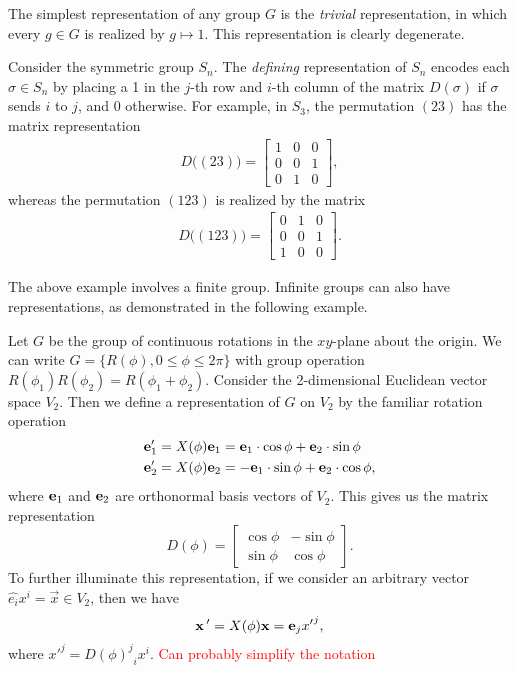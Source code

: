 \begin{example}
    The simplest representation of any group $G$ is the \textit{trivial} representation, in which every $g\in G$ is realized by $g\mapsto 1$. This representation is clearly degenerate.
\end{example}

\begin{example}
    Consider the symmetric group $S_n$. The \textit{defining} representation of $S_n$ encodes each $\sigma\in S_n$ by placing a 1 in the $j$-th row and $i$-th column of the matrix $D(\sigma)$ if $\sigma$ sends $i$ to $j$, and 0 otherwise. For example, in $S_3$, the permutation $(23)$ has the matrix representation
    \begin{align*}
        D\big((23)\big) = \begin{bmatrix} 1 & 0 & 0 \\ 0 & 0 & 1 \\ 0 & 1 & 0 \end{bmatrix},
    \end{align*}
    whereas the permutation $(123)$ is realized by the matrix
    \begin{align*}
        D\big((123)\big) = \begin{bmatrix} 0 & 1 & 0 \\ 0 & 0 & 1 \\ 1 & 0 & 0 \end{bmatrix}.
    \end{align*}
\end{example}

The above example involves a finite group. Infinite groups can also have representations, as demonstrated in the following example.
\begin{example}
    Let $G$ be the group of continuous rotations in the $xy$-plane about the origin. We can write $G = \{R(\phi),0\leq\phi\leq2\pi\}$ with group operation $R(\phi_1)R(\phi_2) = R(\phi_1+\phi_2)$. Consider the 2-dimensional Euclidean vector space $V_2$. Then we define a representation of $G$ on $V_2$ by the familiar rotation operation
    \begin{align}
        \mathbf{e}_1' &= X(\phi)\mathbf{e}_1 = \mathbf{e}_1\cdot\cos\phi + \mathbf{e}_2\cdot\sin\phi\\
        \mathbf{e}_2' &= X(\phi)\mathbf{e}_2 = -\mathbf{e}_1\cdot\sin\phi + \mathbf{e}_2\cdot\cos\phi,
    \end{align}
    where $\mathbf{e}_1$ and $\mathbf{e}_2$ are orthonormal basis vectors of $V_2$. This gives us the matrix representation
    \begin{equation}
        D(\phi) = \begin{bmatrix}
            \cos\phi & -\sin\phi\\
            \sin\phi & \cos\phi
        \end{bmatrix}.
    \end{equation}
    To further illuminate this representation, if we consider an arbitrary vector $\hat{e_i}x^i=\vec{x}\in V_2$, then we have
    \begin{equation}
        \mathbf{x}\,' = X(\phi)\mathbf{x} = \mathbf{e}_j{x'}^j,
    \end{equation}
    where ${x'}^j = {{D(\phi)}^j}_i x^i$.
    \textcolor{red}{Can probably simplify the notation}
\end{example}


